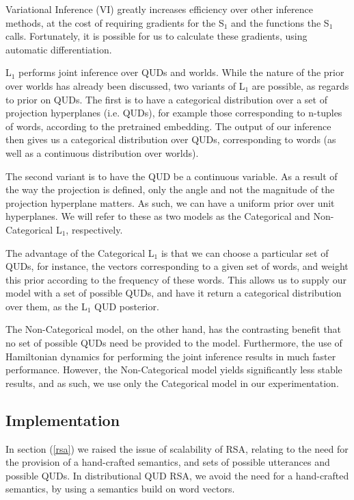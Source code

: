 \documentclass[10pt,letterpaper,twocolumn]{article}
\begin{document}
Variational Inference (VI) greatly increases efficiency over other inference methods, at the cost of requiring gradients for the S$_1$ and the functions the S$_1$ calls. Fortunately, it is possible for us to calculate these gradients, using automatic differentiation.

L$_1$ performs joint inference over QUDs and worlds. While the nature of the prior over worlds has already been discussed, two variants of L$_1$ are possible, as regards to prior on QUDs. The first is to have a categorical distribution over a set of projection hyperplanes (i.e. QUDs), for example those corresponding to n-tuples of words, according to the pretrained embedding. The output of our inference then gives us a categorical distribution over QUDs, corresponding to words (as well as a continuous distribution over worlds). 

The second variant is to have the QUD be a continuous variable. As a result of the way the projection is defined, only the angle and not the magnitude of the projection hyperplane matters. As such, we can have a uniform prior over unit hyperplanes. We will refer to these as two models as the Categorical and Non-Categorical L$_1$, respectively.

The advantage of the Categorical L$_1$ is that we can choose a particular set of QUDs, for instance, the vectors corresponding to a given set of words, and weight this prior according to the frequency of these words. This allows us to supply our model with a set of possible QUDs, and have it return a categorical distribution over them, as the L$_1$ QUD posterior.

The Non-Categorical model, on the other hand, has the contrasting benefit that no set of possible QUDs need be provided to the model. Furthermore, the use of Hamiltonian dynamics for performing the joint inference results in much faster performance. However, the Non-Categorical model yields significantly less stable results, and as such, we use only the Categorical model in our experimentation.




\subsection{Implementation} \label{implementation}

In section (\ref{rsa}) we raised the issue of scalability of RSA, relating to the need for the provision of a hand-crafted semantics, and sets of possible utterances and possible QUDs. In distributional QUD RSA, we avoid the need for a hand-crafted semantics, by using a semantics build on word vectors.
\end{document}
